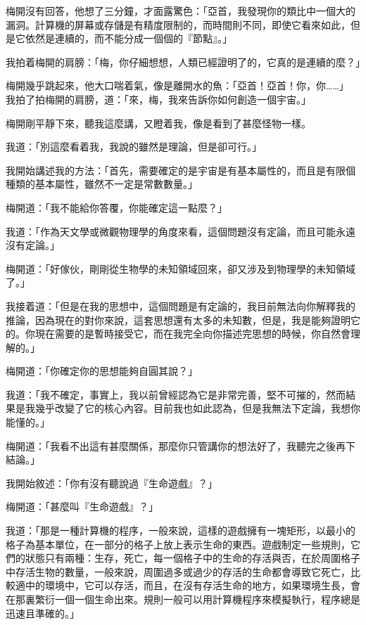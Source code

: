 梅開沒有回答，他想了三分鐘，才面露驚色：「亞首，我發現你的類比中一個大的漏洞。計算機的屏幕或存儲是有精度限制的，而時間則不同，即使它看來如此，但是它依然是連續的，而不能分成一個個的『節點』。」

我拍着梅開的肩膀：「梅，你仔細想想，人類已經證明了的，它真的是連續的麼？」

梅開幾乎跳起來，他大口喘着氣，像是離開水的魚：「亞首！亞首！你，你……」
\\


我拍了拍梅開的肩膀，道：「來，梅，我來告訴你如何創造一個宇宙。」

梅開剛平靜下來，聽我這麼講，又瞪着我，像是看到了甚麼怪物一樣。

我道：「別這麼看着我，我說的雖然是理論，但是卻可行。」

我開始講述我的方法：「首先，需要確定的是宇宙是有基本屬性的，而且是有限個種類的基本屬性，雖然不一定是常數數量。」

梅開道：「我不能給你答覆，你能確定這一點麼？」

我道：「作為天文學或微觀物理學的角度來看，這個問題沒有定論，而且可能永遠沒有定論。」

梅開道：「好傢伙，剛剛從生物學的未知領域回來，卻又涉及到物理學的未知領域了。」

我接着道：「但是在我的思想中，這個問題是有定論的，我目前無法向你解釋我的推論，因為現在的對你來說，這套思想還有太多的未知數，但是，我是能夠證明它的。你現在需要的是暫時接受它，而在我完全向你描述完思想的時候，你自然會理解的。」

梅開道：「你確定你的思想能夠自圓其說？」

我道：「我不確定，事實上，我以前曾經認為它是非常完善，堅不可摧的，然而結果是我幾乎改變了它的核心內容。目前我也如此認為，但是我無法下定論，我想你能懂的。」

梅開道：「我看不出這有甚麼關係，那麼你只管講你的想法好了，我聽完之後再下結論。」

我開始敘述：「你有沒有聽說過『生命遊戲』？」

梅開道：「甚麼叫『生命遊戲』？」

我道：「那是一種計算機的程序，一般來說，這樣的遊戲擁有一塊矩形，以最小的格子為基本單位，在一部分的格子上放上表示生命的東西。遊戲制定一些規則，它們的狀態只有兩種：生存，死亡，每一個格子中的生命的存活與否，在於周圍格子中存活生物的數量，一般來說，周圍過多或過少的存活的生命都會導致它死亡，比較適中的環境中，它可以存活，而且，在沒有存活生命的地方，如果環境生長，會在那裏繁衍一個一個生命出來。規則一般可以用計算機程序來模擬執行，程序總是迅速且準確的。」

